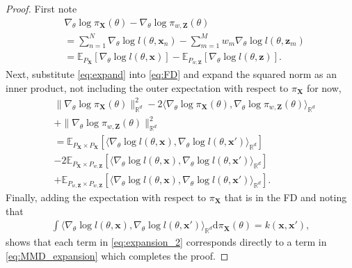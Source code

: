 \documentclass[hyperref]{article}
\theoremstyle{plain}
\theoremstyle{remark}
\newcommand{\bx}{\mathbf{x}}
\newcommand{\bz}{\mathbf{z}}
\newcommand{\bX}{\mathbf{X}}
\newcommand{\bZ}{\mathbf{Z}}
\newcommand{\bbR}{\mathbb{R}}
\newcommand{\bbE}{\mathbb{E}}
\begin{document}
\begin{proof}
	First note 
	\begin{align}
		& \nabla_{\theta}\log\pi_{\bX}(\theta) - \nabla_{\theta}\log\pi_{w,\bZ}(\theta)\nonumber \\
		& = \sum_{n=1}^{N}\nabla_{\theta}\log l(\theta,\bx_{n}) - \sum_{m=1}^{M}w_{m}\nabla_{\theta}\log l(\theta,\bz_{m})\nonumber\\
		& = \bbE_{P_{\bX}}[\nabla_{\theta}\log l(\theta,\bx)] - \bbE_{P_{w,\bZ}}[\nabla_{\theta}\log l(\theta,\bz)].\label{eq:expand}
	\end{align}
	Next, substitute \eqref{eq:expand} into \eqref{eq:FD} and expand the squared norm as an inner product, not including the outer expectation with respect to $\pi_{\bX}$ for now,
	\begin{align}
		&\lVert\nabla_{\theta}\log\pi_{\bX}(\theta)\rVert_{\bbR^{d}}^{2} - 2\langle \nabla_{\theta}\log\pi_{\bX}(\theta),\nabla_{\theta}\log \pi_{w,\bZ}(\theta)\rangle_{\bbR^{d}}\nonumber \\
		& + \lVert\nabla_{\theta}\log\pi_{w,\bZ}(\theta)\rVert_{\bbR^{d}}^{2}\nonumber\\
		& = \bbE_{P_{\bX}\times P_{\bX}}[\langle \nabla_{\theta}\log l(\theta,\bx),\nabla_{\theta}\log l(\theta,\bx')\rangle_{\bbR^{d}}]\nonumber \\
		& - 2\bbE_{P_{\bX}\times P_{w,\bZ}}[\langle \nabla_{\theta}\log l(\theta,\bx),\nabla_{\theta}\log l(\theta,\bx')\rangle_{\bbR^{d}}]\label{eq:expansion_2}\\
		& + \bbE_{P_{w,\bZ}\times P_{w,\bZ}}[\langle \nabla_{\theta}\log l(\theta,\bx),\nabla_{\theta}\log l(\theta,\bx')\rangle_{\bbR^{d}}].\nonumber
	\end{align} 
	Finally, adding the expectation with respect to $\pi_{\bX}$ that is in the FD and noting that 
	\begin{align*}
		\int\langle \nabla_{\theta}\log l(\theta,\bx),\nabla_{\theta}\log l(\theta,\bx')\rangle_{\bbR^{d}}\mathrm{d}\pi_{\bX}(\theta) = k(\bx,\bx'),
	\end{align*}
	shows that each term in \eqref{eq:expansion_2} corresponds directly to a term in \eqref{eq:MMD_expansion} which completes the proof. 
\end{proof}
\end{document}
